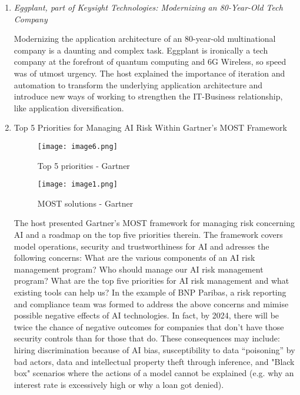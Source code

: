 \begin{enumerate}
    \item \color{dgreen} \textit{Eggplant, part of Keysight Technologies:
          Modernizing an 80-Year-Old Tech Company}

    \color{black} Modernizing the application architecture of an 80-year-old
    multinational company is a daunting and complex task. Eggplant is ironically
    a tech company at the forefront of quantum computing and 6G Wireless, so
    speed was of utmost urgency. The host explained the importance of iteration
    and automation to transform the underlying application architecture and
    introduce new ways of working to strengthen the IT-Business relationship,
    like application diversification.

    \item \color{dgreen} Top 5 Priorities for Managing AI Risk Within Gartner’s
          MOST Framework

    \begin{figure}[H]
        \centering
        \begin{minipage}[b]{0.49\textwidth}
          \texttt{[image: image6.png]}
          \caption*{Top 5 priorities - Gartner}
        \end{minipage}
        \hfill
        \begin{minipage}[b]{0.49\textwidth}
          \texttt{[image: image1.png]}
          \caption*{MOST solutions - Gartner}
        \end{minipage}
    \end{figure}

    \color{black} The host presented Gartner's MOST framework for managing risk
    concerning AI and a roadmap on the top five priorities therein. The
    framework covers model operations, security and trustworthiness for AI and
    adresses the following concerns: What are the various components of an AI
    risk management program? Who should manage our AI risk management program?
    What are the top five priorities for AI risk management and what existing
    tools can help us? In the example of BNP Paribas, a risk reporting and
    compliance team was formed to address the above concerns and mimise possible
    negative effects of AI technologies. In fact, by 2024, there will be twice
    the chance of negative outcomes for companies that don't have those security
    controls than for those that do. These consequences may include: hiring
    discrimination because of AI bias, susceptibility to data “poisoning” by bad
    actors, data and intellectual property theft through inference, and "Black
    box" scenarios where the actions of a model cannot be explained (e.g. why an
    interest rate is excessively high or why a loan got denied).


\end{enumerate}
